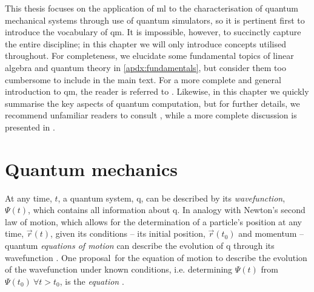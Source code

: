 % 

\par 
This thesis focuses on the application of \acrlong{ml} to the characterisation of quantum mechanical systems
    through use of quantum simulators, 
    so it is pertinent first to introduce the vocabulary of \gls{qm}. 
It is impossible, however, to succinctly capture the entire discipline; 
    in this chapter we will only introduce concepts utilised throughout.
For completeness, we elucidate some fundamental topics of linear algebra and quantum theory in \cref{apdx:fundamentals},
    but consider them too cumbersome to include in the main text. 
For a more complete and general introduction to \gls{qm}, the reader is referred to \cite{griffiths2018introduction, susskind2014quantum}.
Likewise, in this chapter we quickly summarise the key aspects of quantum computation, 
    but for further details, we recommend unfamiliar readers to consult \cite{rieffel2011quantum}, 
    while a more complete discussion is presented in \cite{nielsen2002quantum}.

\section{Quantum mechanics}\label{sec:qm}

At any time, $t$, a quantum system, \gls{q}, can be described by its \emph{wavefunction}, $\Psi(t)$, 
    which contains all information about \gls{q}. 
In analogy with Newton's second law of motion, 
    which allows for the determination of a particle's position at any time, $\vec{r}(t)$, 
    given its conditions -- its initial position, $\vec{r}(t_0)$ and momentum --   
    quantum \emph{equations of motion} can describe the evolution of \gls{q} through its wavefunction \cite{dirac1981principles}. 
One proposal\footnotemark \ for the equation of motion 
    to describe the evolution of the wavefunction under known conditions, 
    i.e. determining $\Psi(t)$ from $\Psi(t_0) \ \forall t > t_0$, 
    is the \emph{\schrodinger equation}  \cite{griffiths2018introduction, mart2020introduce, nelson1966derivation}.
\par 

